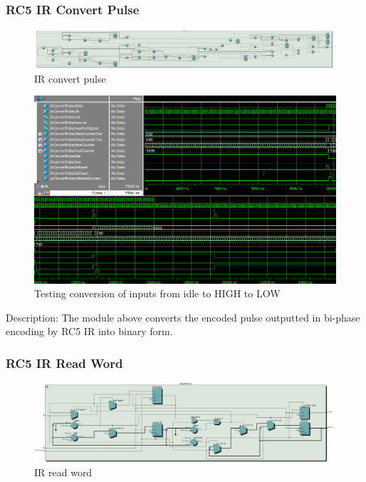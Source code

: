 \documentclass[12pt]{article}
\numberwithin{figure}{subsection}
\begin{document}
\subsubsection{RC5 IR Convert Pulse}

\begin{figure}[ht]
  \centering
  \includegraphics[width=\textwidth]{irconvertpulse.jpg}
  \caption{IR convert pulse}
  \label{fig:irconvertpulse}
\end{figure}

\begin{figure}[ht]
  \centering
  \includegraphics[width=\textwidth]{ir_simulation_convertpulse.png}
  \caption{Testing conversion of inputs from idle to HIGH to LOW}
  \label{fig:ir_simulation_convertpulse}
\end{figure}

Description: The module above converts the encoded pulse outputted in bi-phase encoding by RC5 IR into binary form.

\subsubsection{RC5 IR Read Word}

\begin{figure}[ht]
  \centering
  \includegraphics[width=\textwidth]{irreadword.jpg}
  \caption{IR read word}
  \label{fig:irreadword}
\end{figure}
\end{document}
